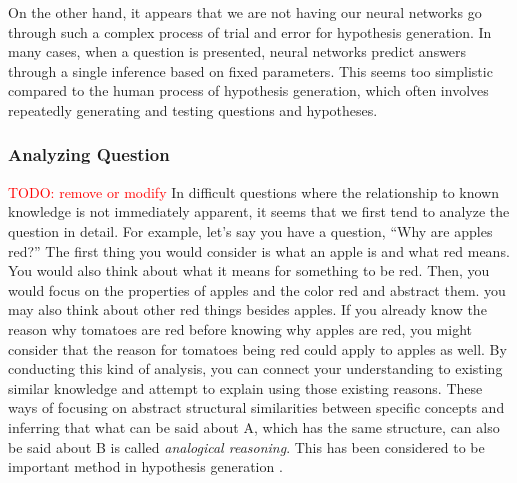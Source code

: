 On the other hand, it appears that we are not having our neural networks go through such a complex process of trial and error for hypothesis generation. In many cases, when a question is presented, neural networks predict answers through a single inference based on fixed parameters. This seems too simplistic compared to the human process of hypothesis generation, which often involves repeatedly generating and testing questions and hypotheses.


\subsubsection{Analyzing Question}
\textcolor{red}{TODO: remove or modify}
In difficult questions where the relationship to known knowledge is not immediately apparent, it seems that we first tend to analyze the question in detail. For example, let's say you have a question, ``Why are apples red?'' The first thing you would consider is what an apple is and what red means. You would also think about what it means for something to be red. Then, you would focus on the properties of apples and the color red and abstract them. you may also think about other red things besides apples. If you already know the reason why tomatoes are red before knowing why apples are red, you might consider that the reason for tomatoes being red could apply to apples as well. By conducting this kind of analysis, you can connect your understanding to existing similar knowledge and attempt to explain using those existing reasons. These ways of focusing on abstract structural similarities between specific concepts and inferring that what can be said about A, which has the same structure, can also be said about B is called \textit{analogical reasoning}. This has been considered to be important method in hypothesis generation \cite{thagard_1984}.

